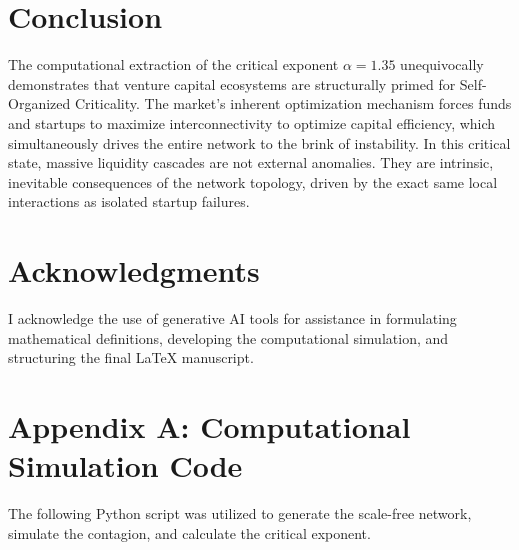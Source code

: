 \documentclass[12pt, a4paper, titlepage]{article}
\begin{document}
\section{Conclusion}
The computational extraction of the critical exponent $\alpha = 1.35$ unequivocally demonstrates that venture capital ecosystems are structurally primed for Self-Organized Criticality. The market's inherent optimization mechanism forces funds and startups to maximize interconnectivity to optimize capital efficiency, which simultaneously drives the entire network to the brink of instability. In this critical state, massive liquidity cascades are not external anomalies. They are intrinsic, inevitable consequences of the network topology, driven by the exact same local interactions as isolated startup failures.

\section*{Acknowledgments}
I acknowledge the use of generative AI tools for assistance in formulating mathematical definitions, developing the computational simulation, and structuring the final LaTeX manuscript.

\section*{Appendix A: Computational Simulation Code}
The following Python script was utilized to generate the scale-free network, simulate the contagion, and calculate the critical exponent.
\end{document}
